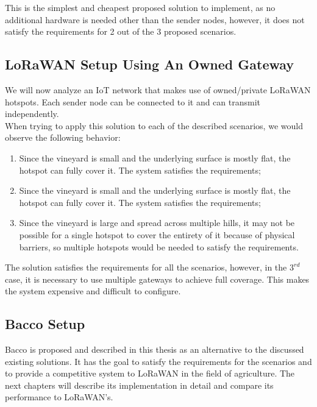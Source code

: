 This is the simplest and cheapest proposed solution to implement, as no additional hardware is needed other than the
sender nodes, however, it does not satisfy the requirements for 2 out of the 3 proposed scenarios.

\subsection{LoRaWAN Setup Using An Owned Gateway}
We will now analyze an \gls{IoT} network that makes use of owned/private LoRaWAN hotspots. Each
sender node can be connected to it and can transmit independently.\\
When trying to apply this solution to each of the described scenarios, we would observe the following behavior:
\begin{enumerate}
    \item Since the vineyard is small and the underlying surface is mostly flat, the hotspot can fully cover it. The
        system satisfies the requirements;
    \item Since the vineyard is small and the underlying surface is mostly flat, the hotspot can fully cover it. The
        system satisfies the requirements;
    \item Since the vineyard is large and spread across multiple hills, it may not be possible for a single hotspot to
        cover the entirety of it because of physical barriers, so multiple hotspots would be needed to satisfy the
        requirements.
\end{enumerate}

The solution satisfies the requirements for all the scenarios, however, in the $3^{rd}$ case, it is necessary to use
multiple gateways to achieve full coverage. This makes the system expensive and difficult to configure.

\subsection{Bacco Setup}
Bacco is proposed and described in this thesis as an alternative to the discussed existing solutions. It has the goal to
satisfy the requirements for the scenarios and to provide a competitive system to LoRaWAN in the field of
agriculture. The next chapters will describe its implementation in detail and compare its performance to LoRaWAN's.
